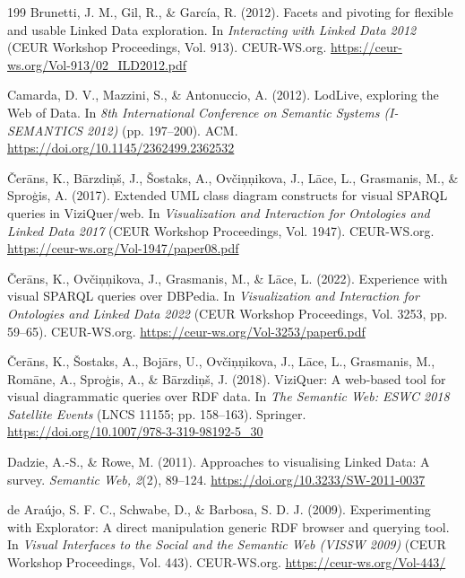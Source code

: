 \documentclass[manuscript,review,screen]{acmart}
\begin{document}
\begin{thebibliography}{199}
 Brunetti, J. M., Gil, R., \& Garc\'{i}a, R. (2012). Facets and pivoting for flexible and usable Linked Data exploration. In \textit{Interacting with Linked Data 2012} (CEUR Workshop Proceedings, Vol. 913). CEUR-WS.org. \url{https://ceur-ws.org/Vol-913/02_ILD2012.pdf}

 Camarda, D. V., Mazzini, S., \& Antonuccio, A. (2012). LodLive, exploring the Web of Data. In \textit{8th International Conference on Semantic Systems (I-SEMANTICS 2012)} (pp. 197--200). ACM. \url{https://doi.org/10.1145/2362499.2362532}

 \v{C}er\={a}ns, K., B\={a}rzdi\c{n}\v{s}, J., \v{S}ostaks, A., Ov\v{c}i\c{n}\c{n}ikova, J., L\={a}ce, L., Grasmanis, M., \& Spro\c{g}is, A. (2017). Extended UML class diagram constructs for visual SPARQL queries in ViziQuer/web. In \textit{Visualization and Interaction for Ontologies and Linked Data 2017} (CEUR Workshop Proceedings, Vol. 1947). CEUR-WS.org. \url{https://ceur-ws.org/Vol-1947/paper08.pdf}

 \v{C}er\={a}ns, K., Ov\v{c}i\c{n}\c{n}ikova, J., Grasmanis, M., \& L\={a}ce, L. (2022). Experience with visual SPARQL queries over DBPedia. In \textit{Visualization and Interaction for Ontologies and Linked Data 2022} (CEUR Workshop Proceedings, Vol. 3253, pp. 59--65). CEUR-WS.org. \url{https://ceur-ws.org/Vol-3253/paper6.pdf}

 \v{C}er\={a}ns, K., \v{S}ostaks, A., Boj\={a}rs, U., Ov\v{c}i\c{n}\c{n}ikova, J., L\={a}ce, L., Grasmanis, M., Rom\={a}ne, A., Spro\c{g}is, A., \& B\={a}rzdi\c{n}\v{s}, J. (2018). ViziQuer: A web-based tool for visual diagrammatic queries over RDF data. In \textit{The Semantic Web: ESWC 2018 Satellite Events} (LNCS 11155; pp. 158--163). Springer. \url{https://doi.org/10.1007/978-3-319-98192-5_30}

 Dadzie, A.-S., \& Rowe, M. (2011). Approaches to visualising Linked Data: A survey. \textit{Semantic Web, 2}(2), 89--124. \url{https://doi.org/10.3233/SW-2011-0037}

 de Ara\'{u}jo, S. F. C., Schwabe, D., \& Barbosa, S. D. J. (2009). Experimenting with Explorator: A direct manipulation generic RDF browser and querying tool. In \textit{Visual Interfaces to the Social and the Semantic Web (VISSW 2009)} (CEUR Workshop Proceedings, Vol. 443). CEUR-WS.org. \url{https://ceur-ws.org/Vol-443/}


\end{thebibliography}
\end{document}
